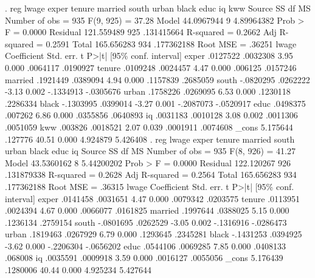 . reg lwage exper tenure married south urban black educ iq kww
{\smallskip}
      Source {\VBAR}       SS           df       MS      Number of obs   =       935
   F(9, 925)       =     37.28
       Model {\VBAR}  44.0967944         9  4.89964382   Prob > F        =    0.0000
    Residual {\VBAR}  121.559489       925  .131415664   R-squared       =    0.2662
   Adj R-squared   =    0.2591
       Total {\VBAR}  165.656283       934  .177362188   Root MSE        =    .36251
{\smallskip}
       lwage {\VBAR} Coefficient  Std. err.      t    P>|t|     [95\% conf. interval]
       exper {\VBAR}   .0127522   .0032308     3.95   0.000     .0064117    .0190927
      tenure {\VBAR}   .0109248   .0024457     4.47   0.000      .006125    .0157246
     married {\VBAR}   .1921449   .0389094     4.94   0.000     .1157839    .2685059
       south {\VBAR}  -.0820295   .0262222    -3.13   0.002    -.1334913   -.0305676
       urban {\VBAR}   .1758226   .0269095     6.53   0.000     .1230118    .2286334
       black {\VBAR}  -.1303995   .0399014    -3.27   0.001    -.2087073   -.0520917
        educ {\VBAR}   .0498375    .007262     6.86   0.000     .0355856    .0640893
          iq {\VBAR}   .0031183   .0010128     3.08   0.002     .0011306    .0051059
         kww {\VBAR}    .003826   .0018521     2.07   0.039     .0001911    .0074608
       _cons {\VBAR}   5.175644    .127776    40.51   0.000     4.924879    5.426408
{\smallskip}
. reg lwage exper tenure married south urban black educ iq
{\smallskip}
      Source {\VBAR}       SS           df       MS      Number of obs   =       935
   F(8, 926)       =     41.27
       Model {\VBAR}  43.5360162         8  5.44200202   Prob > F        =    0.0000
    Residual {\VBAR}  122.120267       926  .131879338   R-squared       =    0.2628
   Adj R-squared   =    0.2564
       Total {\VBAR}  165.656283       934  .177362188   Root MSE        =    .36315
{\smallskip}
       lwage {\VBAR} Coefficient  Std. err.      t    P>|t|     [95\% conf. interval]
       exper {\VBAR}   .0141458   .0031651     4.47   0.000     .0079342    .0203575
      tenure {\VBAR}   .0113951   .0024394     4.67   0.000     .0066077    .0161825
     married {\VBAR}   .1997644   .0388025     5.15   0.000     .1236134    .2759154
       south {\VBAR}  -.0801695   .0262529    -3.05   0.002    -.1316916   -.0286473
       urban {\VBAR}   .1819463   .0267929     6.79   0.000     .1293645    .2345281
       black {\VBAR}  -.1431253   .0394925    -3.62   0.000    -.2206304   -.0656202
        educ {\VBAR}   .0544106   .0069285     7.85   0.000     .0408133     .068008
          iq {\VBAR}   .0035591   .0009918     3.59   0.000     .0016127    .0055056
       _cons {\VBAR}   5.176439   .1280006    40.44   0.000     4.925234    5.427644
{\smallskip}
